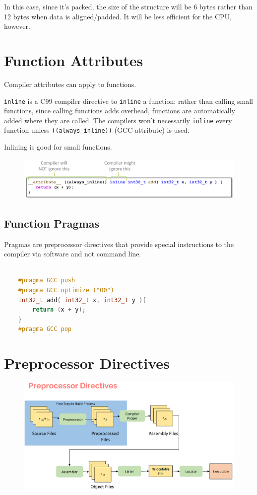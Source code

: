 In this case, since it's packed, the size of the structure will be 6 bytes rather than 12 bytes when data is
aligned/padded. It will be less efficient for the CPU, however.


\section{Function Attributes}

Compiler attributes can apply to functions.

\verb|inline| is a C99 compiler directive to \verb|inline| a function: rather than calling small functions, since calling
functions adds overhead, functions are automatically added where they are called. The compilers won't
necessarily \verb|inline| every function unless \verb|((always_inline))| (GCC attribute) is used.

Inlining is good for small functions.

\begin{figure}[H]
    \centering
    \includegraphics[width=0.75\linewidth]{img/image83.png}
\end{figure}


\subsection{Function Pragmas}

Pragmas are preprocessor directives that provide special instructions to the compiler via software and not
command line.

\begin{lstlisting}[language=c++]

    #pragma GCC push
    #pragma GCC optimize ("O0")
    int32_t add( int32_t x, int32_t y ){
        return (x + y);
    }
    #pragma GCC pop
\end{lstlisting}

\section{Preprocessor Directives}

\begin{figure}[H]
    \centering
    \includegraphics[width=0.75\linewidth]{img/image84.png}
\end{figure}

